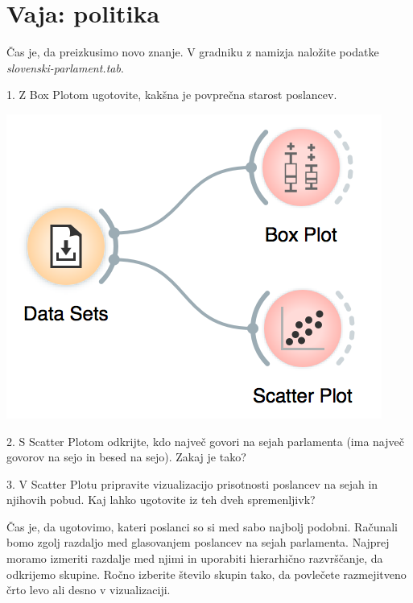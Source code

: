 \chapter{Vaja: politika}
\label{hw:grucenje}

Čas je, da preizkusimo novo znanje. V gradniku  z namizja naložite podatke \textit{slovenski-parlament.tab}.

\hspace{1cm}

1. Z Box Plotom ugotovite, kakšna je povprečna starost poslancev.

\begin{marginfigure}
    \includegraphics[scale=0.6]{workflow1.png}
    \caption{$\;$}
\end{marginfigure}

2. S Scatter Plotom odkrijte, kdo največ govori na sejah parlamenta (ima največ govorov na sejo in besed na sejo). Zakaj je tako?

3. V Scatter Plotu pripravite vizualizacijo prisotnosti poslancev na sejah in njihovih pobud. Kaj lahko ugotovite iz teh dveh spremenljivk?

\hspace{1cm}

Čas je, da ugotovimo, kateri poslanci so si med sabo najbolj podobni. Računali bomo zgolj razdaljo med glasovanjem poslancev na sejah parlamenta. Najprej moramo izmeriti razdalje med njimi in uporabiti hierarhično razvrščanje, da odkrijemo skupine. Ročno izberite število skupin tako, da povlečete razmejitveno črto levo ali desno v vizualizaciji.

